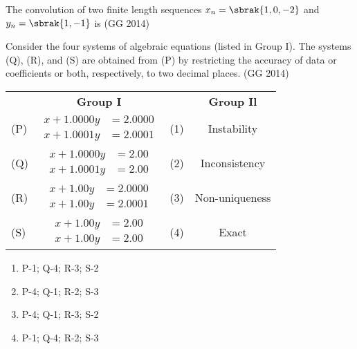 \item The convolution of two finite length sequences $x_n = \sbrak{1, 0, -2}$ and $y_n = \sbrak{1, -1}$ is
\hfill(GG 2014)
\begin{enumerate}
\begin{multicols}{4}
    \item {}
    \item {}
    \item {}
    \item {}
    \end{multicols}
\end{enumerate}

\item Consider the four systems of algebraic equations (listed in Group I).  
The systems (Q), (R), and (S) are obtained from (P) by restricting the accuracy of data or coefficients or both, respectively, to two decimal places.  
\hfill{(GG 2014)}\\
\begin{tabular}{ l c l c }
& \textbf{Group I} & & \textbf{Group Il}\\
(P) &$\begin{aligned}x + 1.0000y &= 2.0000\\x + 1.0001y &= 2.0001 \end{aligned}$ & (1) & Instability \\ 
(Q) &$\begin{aligned}x + 1.0000y &= 2.00\\ x + 1.0001y &= 2.00  \end{aligned}$& (2) & Inconsistency \\ 
(R) & $\begin{aligned}x + 1.00y &= 2.0000\\x + 1.00y &= 2.0001 \end{aligned}$& (3) & Non-uniqueness\\
(S) & $\begin{aligned}x + 1.00y &= 2.00\\x + 1.00y &= 2.00 \end{aligned}$& (4) & Exact   
\end{tabular}
\begin{multicols}{2}
    \begin{enumerate}
         \item P-1; Q-4; R-3; S-2
    \item P-4; Q-1; R-2; S-3
    \item P-4; Q-1; R-3; S-2
    \item P-1; Q-4; R-2; S-3
    \end{enumerate}
\end{multicols}

